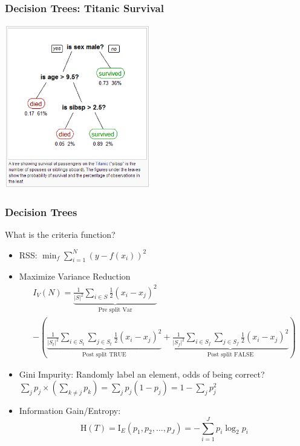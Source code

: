 \documentclass[xcolor=pdftex,dvipsnames,table,mathserif,aspectratio=169]{beamer}
\begin{document}
\begin{frame}
\frametitle{Decision Trees: Titanic Survival}
\includegraphics[width=2.5in]{./resources/titanic.png}
\end{frame}


\begin{frame}
\frametitle{Decision Trees}
\tiny
What is the criteria function?
\begin{itemize}
\item RSS: $\min_f \sum_{i=1}^N (y - f(x_i))^2$
\item Maximize Variance Reduction
\begin{align*}
I_{V}(N)=\underbrace{\frac{1}{|S|^{2}} \sum_{i \in S} \frac{1}{2}\left(x_{i}-x_{j}\right)^{2}}_{\text{Pre split Var}}\\
-\left( \underbrace{\frac{1}{\left|S_{t}\right|^{2}} \sum_{i \in S_{t}} \sum_{j \in S_{t}} \frac{1}{2}\left(x_{i}-x_{j}\right)^{2}}_{\text{Post split  TRUE}}
+\underbrace{\frac{1}{\left|S_{f}\right|^{2}} \sum_{i \in S_{f}} \sum_{j \in S_{f}} \frac{1}{2}\left(x_{i}-x_{j}\right)^{2}}_{\text{Post split FALSE}}
\right)
\end{align*}
\item Gini Impurity: Randomly label an element, odds of being correct? $\sum_j p_j \times ( \sum_{k \neq j} p_k ) =\sum_j p_j (1 -p_j) = 1 -\sum_j p_j^2  $ 
\item Information Gain/Entropy: $$\mathrm{H}(T)=\mathrm{I}_{E}\left(p_{1}, p_{2}, \ldots, p_{J}\right)=-\sum_{i=1}^{J} p_{i} \log _{2} p_{i}$$
\end{itemize}
\end{frame}
\end{document}
